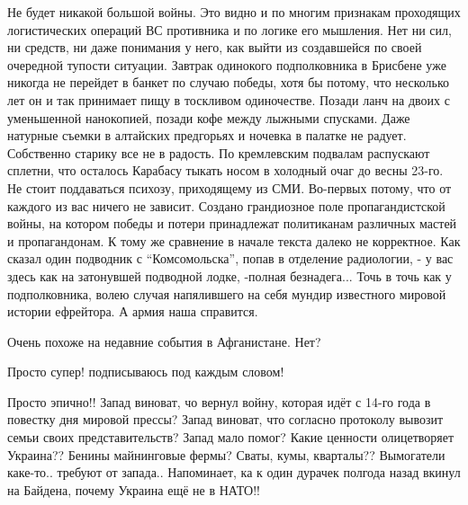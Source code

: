 \begin{itemize}

Не будет никакой большой войны. Это видно и по многим признакам проходящих
логистических операций ВС противника и по логике его мышления. Нет ни сил, ни
средств, ни даже понимания у него, как выйти из создавшейся по своей очередной
тупости ситуации. Завтрак одинокого подполковника в Брисбене уже никогда не
перейдет в банкет по случаю победы, хотя бы потому, что несколько лет он и так
принимает пищу в тоскливом одиночестве. Позади ланч на двоих с уменьшенной
нанокопией, позади кофе между лыжными спусками. Даже натурные съемки в
алтайских предгорьях и ночевка в палатке не радует. Собственно старику все не в
радость. По кремлевским подвалам распускают сплетни, что осталось Карабасу
тыкать носом в холодный очаг до весны 23-го. Не стоит поддаваться психозу,
приходящему из СМИ. Во-первых потому, что от каждого из вас ничего не зависит.
Создано грандиозное поле пропагандистской войны, на котором победы и потери
принадлежат политиканам различных мастей и пропагандонам. К тому же сравнение в
начале текста далеко не корректное. Как сказал один подводник с \enquote{Комсомольска},
попав в отделение радиологии, - у вас здесь как на затонувшей подводной лодке,
-полная безнадега... Точь в точь как у подполковника, волею случая напялившего
на себя мундир известного мировой истории ефрейтора. А армия наша справится.

Очень похоже на недавние события в Афганистане. Нет?

Просто супер! подписываюсь под каждым словом!


Просто эпично!! Запад виноват, чо вернул войну, которая идёт с 14-го года в
повестку дня мировой прессы? Запад виноват, что согласно протоколу вывозит
семьи своих представительств? Запад мало помог? Какие ценности олицетворяет
Украина?? Бенины майнинговые фермы? Сваты, кумы, кварталы?? Вымогатели
каке-то.. требуют от запада.. Напоминает, ка к один дурачек полгода назад
вкинул на Байдена, почему Украина ещё не в НАТО!!



\end{itemize} %
